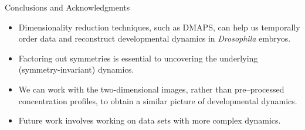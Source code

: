 \documentclass[10pt]{beamer}
\begin{document}
\begin{frame}{Conclusions and Acknowledgments}
    \begin{itemize}
        \item Dimensionality reduction techniques, such as DMAPS, can help us temporally order data and reconstruct developmental dynamics in {\em Drosophila} embryos.
        \item Factoring out symmetries is essential to uncovering the underlying (symmetry-invariant) dynamics.
        \item We can work with the two-dimensional images, rather than pre--processed concentration profiles, to obtain a similar picture of developmental dynamics.
        \item Future work involves working on data sets with more complex dynamics. 
        
    \end{itemize}
    
     \vfill
    

\end{frame}
\end{document}
